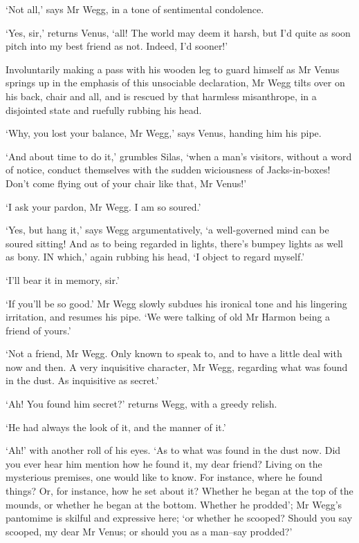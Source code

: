 ‘Not all,’ says Mr Wegg, in a tone of sentimental condolence.

‘Yes, sir,’ returns Venus, ‘all! The world may deem it harsh, but I’d
quite as soon pitch into my best friend as not. Indeed, I’d sooner!’

Involuntarily making a pass with his wooden leg to guard himself as Mr
Venus springs up in the emphasis of this unsociable declaration, Mr Wegg
tilts over on his back, chair and all, and is rescued by that harmless
misanthrope, in a disjointed state and ruefully rubbing his head.

‘Why, you lost your balance, Mr Wegg,’ says Venus, handing him his pipe.

‘And about time to do it,’ grumbles Silas, ‘when a man’s visitors,
without a word of notice, conduct themselves with the sudden wiciousness
of Jacks-in-boxes! Don’t come flying out of your chair like that, Mr
Venus!’

‘I ask your pardon, Mr Wegg. I am so soured.’

‘Yes, but hang it,’ says Wegg argumentatively, ‘a well-governed mind can
be soured sitting! And as to being regarded in lights, there’s bumpey
lights as well as bony. IN which,’ again rubbing his head, ‘I object to
regard myself.’

‘I’ll bear it in memory, sir.’

‘If you’ll be so good.’ Mr Wegg slowly subdues his ironical tone and his
lingering irritation, and resumes his pipe. ‘We were talking of old Mr
Harmon being a friend of yours.’

‘Not a friend, Mr Wegg. Only known to speak to, and to have a little
deal with now and then. A very inquisitive character, Mr Wegg, regarding
what was found in the dust. As inquisitive as secret.’

‘Ah! You found him secret?’ returns Wegg, with a greedy relish.

‘He had always the look of it, and the manner of it.’

‘Ah!’ with another roll of his eyes. ‘As to what was found in the dust
now. Did you ever hear him mention how he found it, my dear friend?
Living on the mysterious premises, one would like to know. For instance,
where he found things? Or, for instance, how he set about it? Whether
he began at the top of the mounds, or whether he began at the bottom.
Whether he prodded’; Mr Wegg’s pantomime is skilful and expressive here;
‘or whether he scooped? Should you say scooped, my dear Mr Venus; or
should you as a man--say prodded?’


